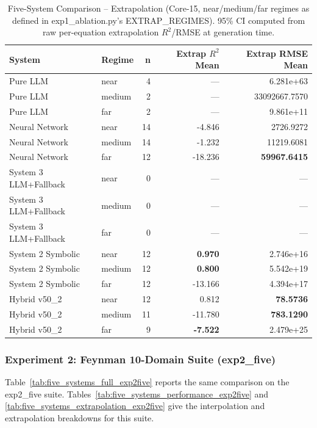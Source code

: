 \documentclass[twoside,11pt]{article}
\begin{document}
\begin{table}[t]
\centering
\caption{Five-System Comparison -- Extrapolation (Core-15, near/medium/far
  regimes as defined in exp1\_ablation.py's EXTRAP\_REGIMES).
  95\% CI computed from raw per-equation extrapolation $R^2$/RMSE at
  generation time.}
\label{tab:five_systems_extrapolation}
\begin{tabular}{llrrr}
\toprule
\textbf{System} & \textbf{Regime} & \textbf{n}
  & \textbf{Extrap $R^2$ Mean} & \textbf{Extrap RMSE Mean} \\
\midrule
Pure LLM & near & 4 & --- & 6.281e+63 \\
Pure LLM & medium & 2 & --- & 33092667.7570 \\
Pure LLM & far & 2 & --- & 9.861e+11 \\
Neural Network & near & 14 & -4.846 & 2726.9272 \\
Neural Network & medium & 14 & -1.232 & 11219.6081 \\
Neural Network & far & 12 & -18.236 & \textbf{59967.6415} \\
System 3 LLM+Fallback & near & 0 & --- & --- \\
System 3 LLM+Fallback & medium & 0 & --- & --- \\
System 3 LLM+Fallback & far & 0 & --- & --- \\
System 2 Symbolic & near & 12 & \textbf{0.970} & 2.746e+16 \\
System 2 Symbolic & medium & 12 & \textbf{0.800} & 5.542e+19 \\
System 2 Symbolic & far & 12 & -13.166 & 4.394e+17 \\
Hybrid v50\_2 & near & 12 & 0.812 & \textbf{78.5736} \\
Hybrid v50\_2 & medium & 11 & -11.780 & \textbf{783.1290} \\
Hybrid v50\_2 & far & 9 & \textbf{-7.522} & 2.479e+25 \\
\bottomrule
\end{tabular}
\end{table}

\subsubsection{Experiment 2: Feynman 10-Domain Suite (exp2\_five)}\label{subsubsec:five-system-exp2}

Table~\ref{tab:five_systems_full_exp2five} reports the same
comparison on the exp2\_five suite. Tables~\ref{tab:five_systems_performance_exp2five}
and \ref{tab:five_systems_extrapolation_exp2five} give the interpolation and
extrapolation breakdowns for this suite.
\end{document}
